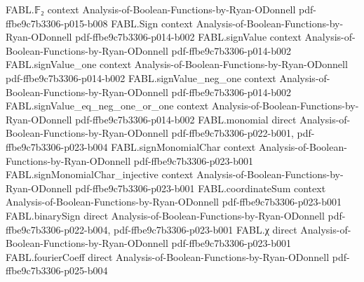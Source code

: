 \begin{theorem}
\label{FABL.measure_finiteFamilyCoefficientBadSetWithParameters_le}
\leanok
{}
\proofstep
  {FABL.𝔽₂}
  {context}
  {Analysis-of-Boolean-Functions-by-Ryan-ODonnell}
  {pdf-ffbe9c7b3306-p015-b008}
\proofstep
  {FABL.Sign}
  {context}
  {Analysis-of-Boolean-Functions-by-Ryan-ODonnell}
  {pdf-ffbe9c7b3306-p014-b002}
\proofstep
  {FABL.signValue}
  {context}
  {Analysis-of-Boolean-Functions-by-Ryan-ODonnell}
  {pdf-ffbe9c7b3306-p014-b002}
\proofstep
  {FABL.signValue_one}
  {context}
  {Analysis-of-Boolean-Functions-by-Ryan-ODonnell}
  {pdf-ffbe9c7b3306-p014-b002}
\proofstep
  {FABL.signValue_neg_one}
  {context}
  {Analysis-of-Boolean-Functions-by-Ryan-ODonnell}
  {pdf-ffbe9c7b3306-p014-b002}
\proofstep
  {FABL.signValue_eq_neg_one_or_one}
  {context}
  {Analysis-of-Boolean-Functions-by-Ryan-ODonnell}
  {pdf-ffbe9c7b3306-p014-b002}
\proofstep
  {FABL.monomial}
  {direct}
  {Analysis-of-Boolean-Functions-by-Ryan-ODonnell}
  {pdf-ffbe9c7b3306-p022-b001,
    pdf-ffbe9c7b3306-p023-b004}
\proofstep
  {FABL.signMonomialChar}
  {context}
  {Analysis-of-Boolean-Functions-by-Ryan-ODonnell}
  {pdf-ffbe9c7b3306-p023-b001}
\proofstep
  {FABL.signMonomialChar_injective}
  {context}
  {Analysis-of-Boolean-Functions-by-Ryan-ODonnell}
  {pdf-ffbe9c7b3306-p023-b001}
\proofstep
  {FABL.coordinateSum}
  {context}
  {Analysis-of-Boolean-Functions-by-Ryan-ODonnell}
  {pdf-ffbe9c7b3306-p023-b001}
\proofstep
  {FABL.binarySign}
  {direct}
  {Analysis-of-Boolean-Functions-by-Ryan-ODonnell}
  {pdf-ffbe9c7b3306-p022-b004,
    pdf-ffbe9c7b3306-p023-b001}
\proofstep
  {FABL.χ}
  {direct}
  {Analysis-of-Boolean-Functions-by-Ryan-ODonnell}
  {pdf-ffbe9c7b3306-p023-b001}
\proofstep
  {FABL.fourierCoeff}
  {direct}
  {Analysis-of-Boolean-Functions-by-Ryan-ODonnell}
  {pdf-ffbe9c7b3306-p025-b004}

\end{theorem}
